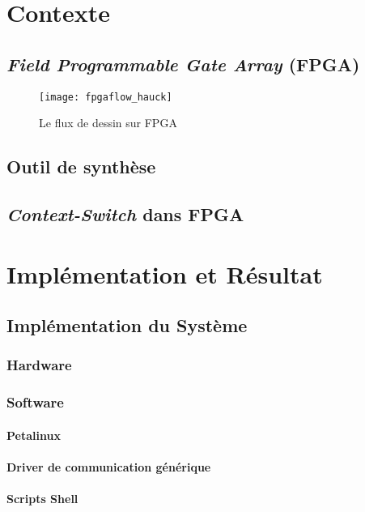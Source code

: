 \chapter{Contexte}
\section{\emph{Field Programmable Gate Array} (FPGA)}
\blindtext
\begin{figure}[tb]
	\label{fig:fpgaflow}
	\centering
	\texttt{[image: fpgaflow\_hauck]}
	\caption{Le flux de dessin sur FPGA}
\end{figure}

\section{Outil de synthèse}
\Blindtext

\section{\emph{Context-Switch} dans FPGA}
\Blindtext


\chapter{Implémentation et Résultat}

\section{Implémentation du Système}
\subsection{Hardware}

\subsection{Software}
\subsubsection{Petalinux}
\subsubsection{Driver de communication générique}
\subsubsection{Scripts Shell}

